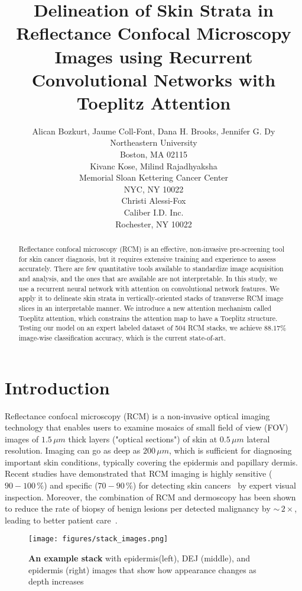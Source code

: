 \documentclass{article}
\title{Delineation of Skin Strata in Reflectance Confocal Microscopy Images using Recurrent Convolutional Networks with Toeplitz Attention}
\author{
  Alican Bozkurt, Jaume Coll-Font, Dana H. Brooks, Jennifer G. Dy \\
  Northeastern University\\
  Boston, MA 02115 \\
  \And
  Kivanc Kose, Milind Rajadhyaksha \\
  Memorial Sloan Kettering Cancer Center\\
  NYC, NY 10022 \\
  \And
  Christi Alessi-Fox \\
  Caliber I.D. Inc.\\
  Rochester, NY 10022 \\
}
\begin{document}

\maketitle

\begin{abstract}
Reflectance confocal microscopy (RCM) is an effective, non-invasive pre-screening tool for skin cancer diagnosis, but it requires extensive training and experience to assess accurately. There are few quantitative tools available to standardize image acquisition and analysis, and the ones that are available are not interpretable. In this study, we use a recurrent neural network with attention on convolutional network features. We apply it to delineate skin strata in vertically-oriented stacks of transverse RCM image slices in an interpretable manner. We introduce a new attention mechanism called Toeplitz attention, which constrains the attention map to have a Toeplitz structure. Testing our model on an expert labeled dataset of 504 RCM stacks, we achieve $88.17\%$ image-wise classification accuracy, which is the current state-of-art.
\end{abstract}

\section{Introduction}
Reflectance confocal microscopy (RCM) is a non-invasive optical imaging technology that enables users to examine mosaics of small field of view (FOV) images of $1.5\,\mu m$ thick layers ("optical sections") of skin at $0.5\,\mu m$ lateral resolution. Imaging can go as deep as $200\,\mu m$, which is sufficient for diagnosing important skin conditions,  typically covering the epidermis and papillary dermis. Recent studies have demonstrated that RCM imaging is highly sensitive ($90-100\,\%$) and specific ($70-90\,\%$) for detecting skin cancers~\cite{Raj16} by expert visual inspection. Moreover, the combination of RCM and dermoscopy has been shown to reduce the rate of biopsy of benign lesions per detected malignancy by ${\sim}\,2\times$, leading to better patient care~\cite{Borsari16,Pell16}.

\begin{figure}[ht]
    \centering
    \texttt{[image: figures/stack\_images.png]} 
    \caption{\textbf{An example stack} with epidermis(left), DEJ (middle), and epidermis (right) images that show how appearance changes as depth increases}
    \label{fig:stack-mosaic}
\end{figure}
\end{document}
